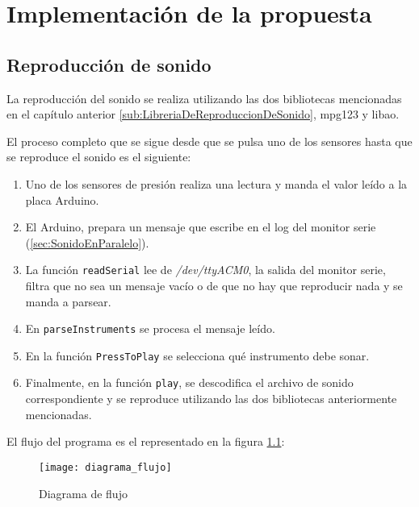
\chapter{Implementación de la propuesta}
\label{cha:Implementacion}

    \section{Reproducción de sonido} %
    \label{sec:ReproduccionDeSonido}

        La reproducción del sonido se realiza utilizando las dos bibliotecas mencionadas en el capítulo
        anterior \ref{sub:LibreriaDeReproduccionDeSonido}, mpg123 y libao.

        El proceso completo que se sigue desde que se pulsa uno de los sensores hasta que se reproduce el sonido es el
        siguiente:
        \begin{enumerate}
            \item Uno de los sensores de presión realiza una lectura y manda el valor leído a la placa Arduino.
            \item El Arduino, prepara un mensaje que escribe en el log del monitor serie (\ref{sec:SonidoEnParalelo}).
            \item La función \texttt{readSerial} lee de \textit{/dev/ttyACM0}, la salida del monitor serie, filtra que
            no sea un mensaje vacío o de que no hay que reproducir nada y se manda a parsear.
            \item En \texttt{parseInstruments} se procesa el mensaje leído.
            \item En la función \texttt{PressToPlay} se selecciona qué instrumento debe sonar.
            \item Finalmente, en la función \texttt{play}, se descodifica el archivo de sonido correspondiente y se
            reproduce utilizando las dos bibliotecas anteriormente mencionadas.
        \end{enumerate}

        El flujo del programa es el representado en la figura \ref{fig:DiagramaFlujo}:

        \begin{figure}[ht]
            \centering
            \texttt{[image: diagrama\_flujo]}
            \caption{Diagrama de flujo\label{fig:DiagramaFlujo}}
        \end{figure}

